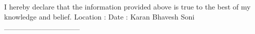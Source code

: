 

\begin{cventries}

  \cventry
{I hereby declare that the information provided above is true to the best of my knowledge and belief.} %
{ } %
{  } %
{  } %
{ %
\vspace{-.5\baselineskip} 
}
\cventry
{Location : }
{Date : }
{}
{}
{\vspace{-.5\baselineskip} 
}
\newline
\newline
\newline
\newline
\newline
\cventry
{Karan Bhavesh Soni}
{\_\_\_\_\_\_\_\_\_\_\_\_\_\_}
{}
{}
{}
\end{cventries}
\vspace{-1\baselineskip} 